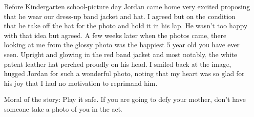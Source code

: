 Before Kindergarten school-picture day Jordan came home very excited proposing
that he wear our dress-up band jacket and hat. I agreed but on the condition
that he take off the hat for the photo and hold it in his lap. He wasn't too
happy with that idea but agreed. A few weeks later when the photos came, there
looking at me from the glossy photo was the happiest 5 year old you have ever
seen. Upright and glowing in the red band jacket and most notably, the white
patent leather hat perched proudly on his head.  I smiled back at the image,
hugged Jordan for such a wonderful photo, noting that my heart was so glad for
his joy that I had no motivation to reprimand him.

Moral of the story: Play it safe. If you are going to defy your mother, don't
have someone take a photo of you in the act.
